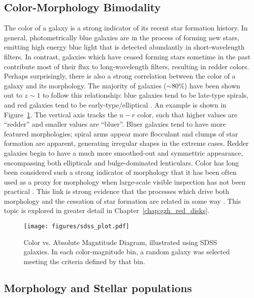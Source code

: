 \subsection{Color-Morphology Bimodality}

The color of a galaxy is a strong indicator of its recent star formation history. In general, photometrically blue galaxies are in the process of forming new stars, emitting high energy blue light that is detected abundantly in short-wavelength filters. In contrast, galaxies which have ceased forming stars sometime in the past contribute most of their flux to long-wavelength filters, resulting in redder colors. Perhaps surprisingly, there is also a strong correlation between the color of a galaxy and its morphology. The majority of galaxies ($\sim80\%$) have been shown out to $z\sim1$ to follow this relationship: blue galaxies tend to be late-type spirals, and red galaxies tend to be early-type/elliptical \citep{Tully1982,Strateva2001,Baldry2004,Conselice2006,Martin2007,Mignoli2009}. An example is shown in Figure~\ref{fig:cmd}. The vertical axis tracks the $u-r$ color, such that higher values are ``redder'' and smaller values are ``bluer''. Bluer galaxies tend to have more featured morphologies; spiral arms appear more flocculant and clumps of star formation are apparent, generating irregular shapes in the extreme cases. Redder galaxies begin to have a much more smoothed-out and symmettric appearance, encompassing both ellipticals and bulge-dominated lenticulars. Color has long been considered such a strong indicator of morphology that it has been often used as a proxy for morphology when large-scale visible inspection has not been practical \citep{Cooray2005,Lee2007,Salimbeni2008,Simon2009}. This link is strong evidence that the processes which drive both morphology and the cessation of star formation are related in some way \citep{Masters2010,Buta2013}. This topic is explored in greater detail in Chapter~\ref{chap:gzh_red_disks}. 

\begin{figure}
\centering
\texttt{[image: figures/sdss\_plot.pdf]}
\label{fig:cmd}
\caption{Color vs. Absolute Magntitude Diagram, illustrated using SDSS galaxies. In each color-magnitude bin, a random galaxy was selected meeting the criteria defined by that bin.}
\end{figure}

\subsection{Morphology and Stellar populations}

